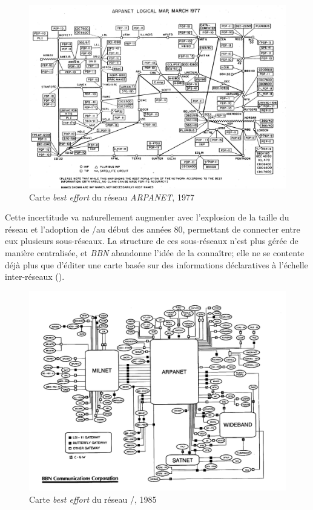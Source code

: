 \begin{figure}[!ht]
\centering
\includegraphics[width=\columnwidth]{images/arpa-1977-approx}
\caption{Carte {\em best effort} du réseau {\em ARPANET}, 1977\cite{bbn-report}}
\label{fig:bbn-maps-1977}
\end{figure}

Cette incertitude va naturellement augmenter avec l'explosion de la taille du
réseau et l'adoption de \tcp/\ip au début des années 80, permettant de connecter
entre eux plusieurs sous-réseaux. La structure de ces sous-réseaux n'est plus gérée de manière
centralisée, et {\em BBN} abandonne l'idée de la connaître; elle ne se contente
déjà plus que d'éditer une carte basée sur des informations déclaratives à
l'échelle inter-réseaux ().

\begin{figure}[!ht]
\centering
\includegraphics[width=\columnwidth]{images/inet-1985}
\caption{Carte {\em best effort} du réseau \tcp/\ip, 1985\cite{bbn-report}}
\label{fig:bbn-maps-1985}
\end{figure}

